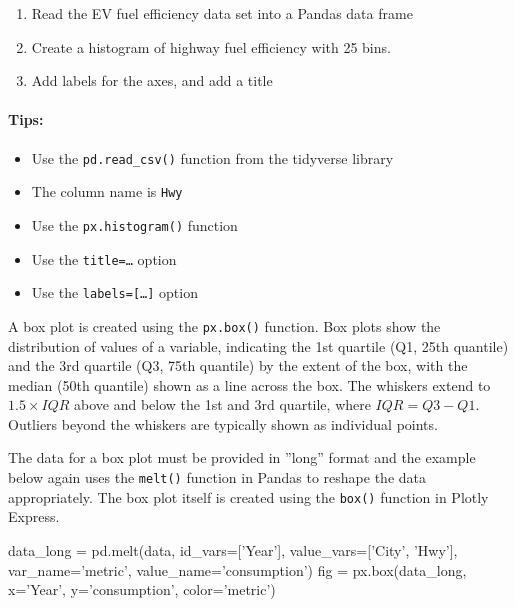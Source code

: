 \begin{exercisebox}
\begin{enumerate}
    \item Read the EV fuel efficiency data set into a Pandas data frame
    \item Create a histogram of highway fuel efficiency with 25 bins.
    \item Add labels for the axes, and add a title
\end{enumerate}

\paragraph*{Tips:}
    \begin{itemize} 
	   \item Use the \texttt{pd.read\_csv()} function from the tidyverse library
       \item The column name is \texttt{Hwy}
       \item Use the \texttt{px.histogram()} function
       \item Use the \texttt{title=\ldots} option
       \item Use the \texttt{labels=[\ldots]} option
    \end{itemize}
\end{exercisebox}

A box plot is created using the \texttt{px.box()} function. Box plots show the distribution of values of a variable, indicating the 1st quartile (Q1, 25th quantile) and the 3rd quartile (Q3, 75th quantile) by the extent of the box, with the median (50th quantile) shown as a line across the box. The whiskers extend to $1.5 \times IQR$ above and below the 1st and 3rd quartile, where $IQR = Q3-Q1$. Outliers beyond the whiskers are typically shown as individual points. 

The data for a box plot must be provided in ''long'' format and the example below again uses the \texttt{melt()} function in Pandas to reshape the data appropriately. The box plot itself is created using the \texttt{box()} function in Plotly Express. 

\begin{pythoncode}
data_long = pd.melt(data, 
    id_vars=['Year'], 
    value_vars=['City', 'Hwy'], 
    var_name='metric', 
    value_name='consumption')
fig = px.box(data_long, x='Year', y='consumption', color='metric')
\end{pythoncode}

